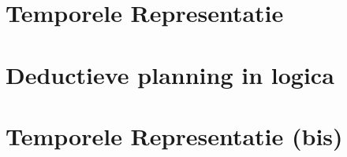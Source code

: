 \section{Temporele Representatie}
\section{Deductieve planning in logica}
\section{Temporele Representatie (bis)}